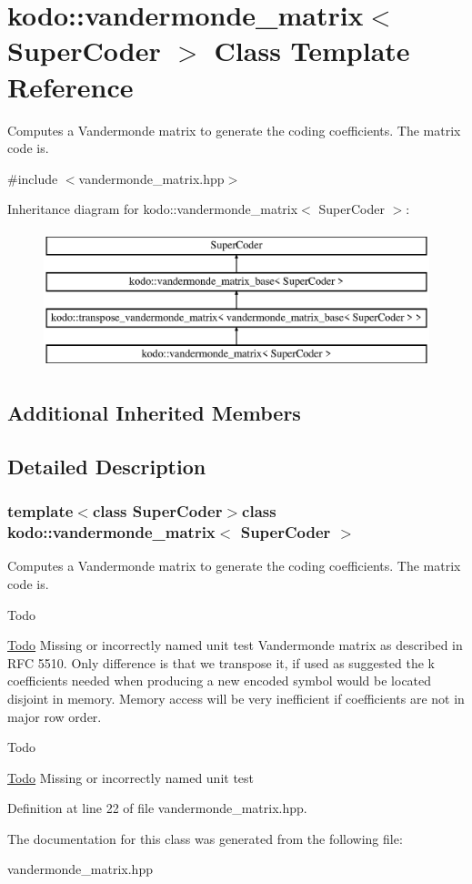 \hypertarget{classkodo_1_1vandermonde__matrix}{\section{kodo\-:\-:vandermonde\-\_\-matrix$<$ Super\-Coder $>$ Class Template Reference}
\label{classkodo_1_1vandermonde__matrix}
}


Computes a Vandermonde matrix to generate the coding coefficients. The matrix code is.  




{\ttfamily \#include $<$vandermonde\-\_\-matrix.\-hpp$>$}

Inheritance diagram for kodo\-:\-:vandermonde\-\_\-matrix$<$ Super\-Coder $>$\-:\begin{figure}[H]
\begin{center}
\leavevmode
\includegraphics[height=4.000000cm]{classkodo_1_1vandermonde__matrix}
\end{center}
\end{figure}
\subsection*{Additional Inherited Members}


\subsection{Detailed Description}
\subsubsection*{template$<$class Super\-Coder$>$class kodo\-::vandermonde\-\_\-matrix$<$ Super\-Coder $>$}

Computes a Vandermonde matrix to generate the coding coefficients. The matrix code is. 

\begin{DoxyRefDesc}{Todo}
\item[\hyperlink{todo__todo000050}{Todo}]Missing or incorrectly named unit test Vandermonde matrix as described in R\-F\-C 5510. Only difference is that we transpose it, if used as suggested the k coefficients needed when producing a new encoded symbol would be located disjoint in memory. Memory access will be very inefficient if coefficients are not in major row order. \end{DoxyRefDesc}
\begin{DoxyRefDesc}{Todo}
\item[\hyperlink{todo__todo000051}{Todo}]Missing or incorrectly named unit test \end{DoxyRefDesc}


Definition at line 22 of file vandermonde\-\_\-matrix.\-hpp.



The documentation for this class was generated from the following file\-:\begin{DoxyCompactItemize}
\item 
vandermonde\-\_\-matrix.\-hpp\end{DoxyCompactItemize}

